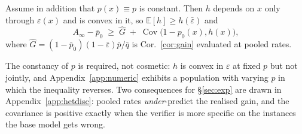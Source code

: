 \documentclass[11pt]{article}
\begin{document}
\begin{corollary}\label{cor:jensen}
Assume in addition that $p(x)\equiv p$ is constant. Then $h$ depends on $x$ only through $\varepsilon(x)$ and is convex in it, so $\mathbb{E}[h]\ge h(\bar\varepsilon)$ and
\[
A_\infty-\bar p_0\;\ge\;\widehat{G}\;+\;\operatorname{Cov}\bigl(1-p_0(x),h(x)\bigr),
\]
where $\widehat{G}=(1-\bar p_0)(1-\bar\varepsilon)\bar p/\bar q$ is Cor.~\ref{cor:gain} evaluated at pooled rates.
\end{corollary}

The constancy of $p$ is required, not cosmetic: $h$ is convex in $\varepsilon$ at fixed $p$ but not jointly, and Appendix~\ref{app:numeric} exhibits a population with varying $p$ in which the inequality reverses. Two consequences for \S\ref{sec:exp} are drawn in Appendix~\ref{app:hetdisc}: pooled rates \emph{under}-predict the realised gain, and the covariance is positive exactly when the verifier is more specific on the instances the base model gets wrong.

\end{document}
